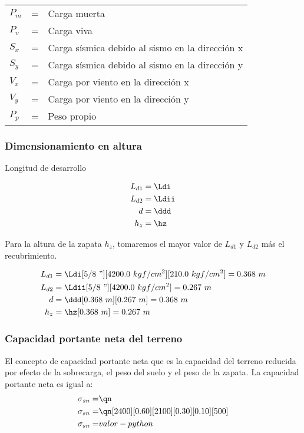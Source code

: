 \documentclass{article}%
\begin{document}
\begin{table}[h!]
    \centering
    \begin{tabular}{lll}
        $P_m$ &=&   Carga muerta\\
        $P_v$ &=&   Carga viva\\
        $S_x$ &=&   Carga sísmica debido al sismo en la dirección x\\
        $S_y$ &=&   Carga sísmica debido al sismo en la dirección y\\
        $V_x$ &=&   Carga por viento en la dirección x\\
        $V_y$ &=&   Carga por viento en la dirección y\\
        $P_p$ &=&   Peso propio\\
    \end{tabular}
\end{table}

\subsubsection{Dimensionamiento en altura}
Longitud de desarrollo

\begin{align}
	L_{d1} &= \Ldi\\
	L_{d2} &= \Ldii\\
	d      &= \ddd \\
	h_z	   &= \hz
\end{align}

Para la altura de la zapata $h_z$, tomaremos el mayor valor de $L_{d1}$ y $L_{d2}$ más el recubrimiento.

\begin{align*}
    L_{d1} &= \Ldi[5/8~"][4200.0~kgf/cm^2][210.0~kgf/cm^2] = 0.368~m\\
	L_{d2} &= \Ldii[5/8~"][4200.0~kgf/cm^2] = 0.267~m\\
	d      &= \ddd[0.368~m][0.267~m] =  0.368~m\\
	h_z	   &= \hz[0.368~m] = 0.267~m
\end{align*}

\subsubsection{Capacidad portante neta del terreno}

El concepto de capacidad portante neta que es la capacidad del terreno reducida por efecto de la sobrecarga, el peso del suelo y el peso de la zapata. La capacidad portante neta es igual a:
\begin{align}
	\sigma_{sn} =&\qn \\
	\sigma_{sn} =&\qn[2400][0.60][2100][0.30][0.10][500]\\
	\sigma_{sn} =& valor-python \nonumber
\end{align}
\end{document}
